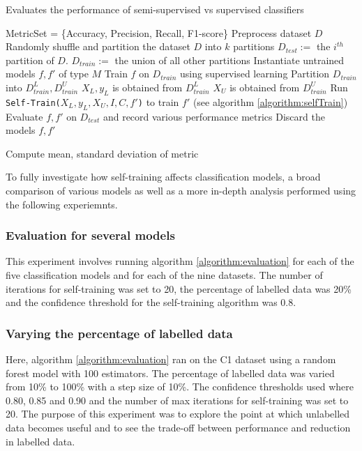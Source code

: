 \documentclass[../main.tex]{subfiles}
\begin{document}
\begin{algorithm}[H]
\caption{Evaluates the performance of semi-supervised vs supervised classifiers}
\label{algorithm:evaluation}
\begin{algorithmic}[1]
    \State MetricSet = \{Accuracy, Precision, Recall, F1-score\}
    \State Preprocess dataset $D$
    \State Randomly shuffle and partition the dataset $D$ into $k$ partitions
        \State $D_{test} :=$ the $i^{th}$ partition of $D$.
        \State $D_{train} :=$ the union of all other partitions
        \State Instantiate untrained models $f,f'$ of type $M$
        \State Train $f$ on $D_{train}$ using supervised learning
        \State Partition $D_{train}$ into $D_{train}^L, D_{train}^U$
        \State $X_L, y_L$ is obtained from $D_{train}^L$  
        \State $X_U$ is obtained from $D_{train}^U$
        \State Run \texttt{Self-Train($X_L, y_L, X_U, I, C, f'$)} to train $f'$ (see algorithm \ref{algorithm:selfTrain})
        \State Evaluate $f, f'$ on $D_{test}$ and record various performance metrics
        \State Discard the models $f, f'$
    \EndFor
    
        \State Compute mean, standard deviation of metric
    \EndFor
\EndProcedure
\end{algorithmic}
\end{algorithm}

To fully investigate how self-training affects classification models, a broad comparison of various models as well as a more in-depth analysis performed using the following experiemnts. 

\subsubsection{Evaluation for several models}

This experiment involves running algorithm \ref{algorithm:evaluation} for each of the five classification models and for each of the nine datasets. The number of iterations for self-training was set to 20, the percentage of labelled data was 20\% and the confidence threshold for the self-training algorithm was 0.8.  

\subsubsection{Varying the percentage of labelled data}

Here, algorithm \ref{algorithm:evaluation} ran on the C1 dataset using a random forest model with 100 estimators. The percentage of labelled data was varied from 10\% to 100\% with a step size of 10\%. The confidence thresholds used where 0.80, 0.85 and 0.90 and the number of max iterations for self-training was set to 20. The purpose of this experiment was to explore the point at which unlabelled data becomes useful and to see the trade-off between performance and reduction in labelled data.
\end{document}
